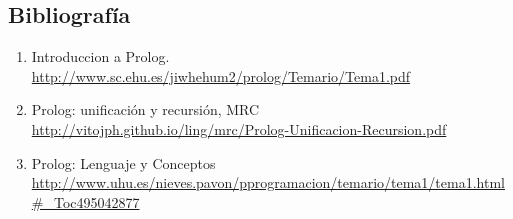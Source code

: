 \documentclass[paper=a4, fontsize=12pt]{article} 		%
\numberwithin{equation}{section}						%
\numberwithin{table}{section} 							%
\begin{document}
\subsection{Bibliografía}
\begin{enumerate}
\item Introduccion a Prolog.  \url{http://www.sc.ehu.es/jiwhehum2/prolog/Temario/Tema1.pdf}
\item Prolog: unificación y recursión, MRC \url{http://vitojph.github.io/ling/mrc/Prolog-Unificacion-Recursion.pdf}
\item Prolog: Lenguaje y Conceptos \url{http://www.uhu.es/nieves.pavon/pprogramacion/temario/tema1/tema1.html#_Toc495042877}
\end{enumerate}
\end{document}
